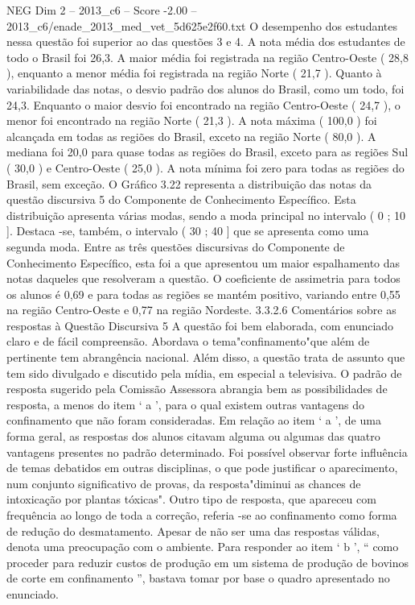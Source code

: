 \begin{textsample}{NEG Dim 2 – 2013\_c6 – Score -2.00 – 2013\_c6/enade\_2013\_med\_vet\_5d625e2f60.txt}
O desempenho dos estudantes nessa questão foi superior ao das questões 3 e 4.
A nota média dos estudantes de todo o Brasil foi 26,3.
A maior média foi registrada na região Centro-Oeste ( 28,8 ), enquanto a menor média foi registrada na região Norte ( 21,7 ).
Quanto à variabilidade das notas, o desvio padrão dos alunos do Brasil, como um todo, foi 24,3.
Enquanto o maior desvio foi encontrado na região Centro-Oeste ( 24,7 ), o menor foi encontrado na região Norte ( 21,3 ).
A nota máxima ( 100,0 ) foi alcançada em todas as regiões do Brasil, exceto na região Norte ( 80,0 ).
A mediana foi 20,0 para quase todas as regiões do Brasil, exceto para as regiões Sul ( 30,0 ) e Centro-Oeste ( 25,0 ).
A nota mínima foi zero para todas as regiões do Brasil, sem exceção.
O Gráfico 3.22 representa a distribuição das notas da questão discursiva 5 do Componente de Conhecimento Específico.
Esta distribuição apresenta várias modas, sendo a moda principal no intervalo ( 0 ; 10 ].
Destaca -se, também, o intervalo ( 30 ; 40 ] que se apresenta como uma segunda moda.
Entre as três questões discursivas do Componente de Conhecimento Específico, esta foi a que apresentou um maior espalhamento das notas daqueles que resolveram a questão.
O coeficiente de assimetria para todos os alunos é 0,69 e para todas as regiões se mantém positivo, variando entre 0,55 na região Centro-Oeste e 0,77 na região Nordeste. 3.3.2.6 Comentários sobre as respostas à Questão Discursiva 5 A questão foi bem elaborada, com enunciado claro e de fácil compreensão.
Abordava o tema"confinamento"que além de pertinente tem abrangência nacional.
Além disso, a questão trata de assunto que tem sido divulgado e discutido pela mídia, em especial a televisiva.
O padrão de resposta sugerido pela Comissão Assessora abrangia bem as possibilidades de resposta, a menos do item ‘ a ’, para o qual existem outras vantagens do confinamento que não foram consideradas.
Em relação ao item ‘ a ’, de uma forma geral, as respostas dos alunos citavam alguma ou algumas das quatro vantagens presentes no padrão determinado.
Foi possível observar forte influência de temas debatidos em outras disciplinas, o que pode justificar o aparecimento, num conjunto significativo de provas, da resposta"diminui as chances de intoxicação por plantas tóxicas".
Outro tipo de resposta, que apareceu com frequência ao longo de toda a correção, referia -se ao confinamento como forma de redução do desmatamento.
Apesar de não ser uma das respostas válidas, denota uma preocupação com o ambiente.
Para responder ao item ‘ b ’, “ como proceder para reduzir custos de produção em um sistema de produção de bovinos de corte em confinamento ”, bastava tomar por base o quadro apresentado no enunciado.

\end{textsample}
